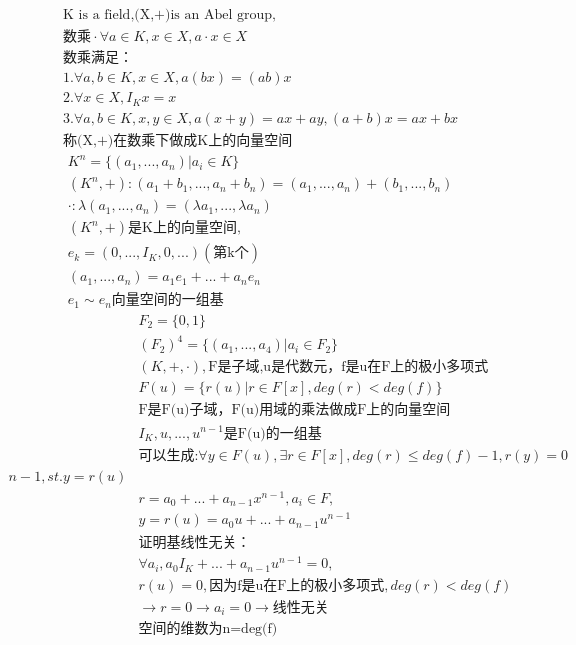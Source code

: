 \documentclass[12pt, a4paper]{article}  %
\begin{document}
\begin{align}
    &\text{K is a field,(X,+)is an Abel group},\\
    &\text{数乘}\cdot \forall a\in K,x\in X,a\cdot x\in X\\
    &\text{数乘满足：}\\
    &1.\forall a,b\in K,x\in X,a(bx)=(ab)x\\
    &2.\forall x\in X,I_Kx=x\\
    &3.\forall a,b\in K,x,y\in X,a(x+y)=ax+ay,(a+b)x=ax+bx\\
    &\text{称(X,+)在数乘下做成K上的向量空间}
\end{align}
\begin{align}
    &K^n=\{(a_1,...,a_n)|a_i\in K\}\\
    &(K^n,+):(a_1+b_1,...,a_n+b_n)=(a_1,...,a_n)+(b_1,...,b_n)\\
    &\cdot :\lambda(a_1,...,a_n)=(\lambda a_1,...,\lambda a_n)\\
    &(K^n,+)\text{是K上的向量空间},\\
    & e_k=(0,...,I_K,0,...)(\text{第k个})\\
    &(a_1,...,a_n)=a_1e_1+...+a_ne_n\\
    &e_1\sim e_n\text{向量空间的一组基}
\end{align}
\begin{align}
    &F_2=\{0,1\}\\
    &(F_2)^4=\{(a_1,...,a_4)|a_i\in F_2\}\\
    &(K,+,\cdot),\text{F是子域,u是代数元，f是u在F上的极小多项式}\\
    &F(u)=\{r(u)|r\in F[x],deg(r)<deg(f)\}\\
    &\text{F是F(u)子域，F(u)用域的乘法做成F上的向量空间}\\
    &I_K,u,...,u^{n-1}\text{是F(u)的一组基}\\
    &\text{可以生成:}\forall y\in F(u),\exists r\in F[x],deg(r)\leqslant deg(f)-1,r(y)=0\\ n-1,st.y=r(u)\\
    &r=a_0+...+a_{n-1}x^{n-1},a_i\in F,\\
    &y=r(u)=a_0u+...+a_{n-1}u^{n-1}\\
    &\text{证明基线性无关：}\\
    &\forall a_i,a_0I_K+...+a_{n-1}u^{n-1}=0,\\
    &r(u)=0,\text{因为f是u在F上的极小多项式},deg(r)<deg(f)\\
    &\rightarrow r=0\rightarrow a_i=0\rightarrow\text{线性无关}\\
    &\text{空间的维数为n=deg(f)}
\end{align}
\end{document}
